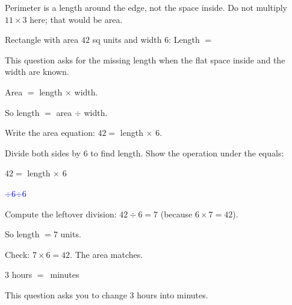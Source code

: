 
Perimeter is a length around the edge, not the space inside. Do not multiply
$11 \times 3$ here; that would be area.


Rectangle with area $42$ sq units and width $6$: Length $= $\ansblank


This question asks for the missing length when the flat space inside and the
width are known.

\begin{words}
  \item Area $=$ length $\times$ width.
  \item So length $=$ area $\div$ width.
\end{words}

\begin{steps}
  \item Write the area equation: $42 = $ length $\times$ 6.
  \item Divide both sides by 6 to find length. Show the operation under the
        equals:
        \begin{center}
          $42 = $ length $\times$ 6\par\smallskip
          \underline{\hspace{0.6em}\textcolor{blue}{$\div 6$}\hspace{1.6em}\textcolor{blue}{$\div 6$}\hspace{0.6em}}
        \end{center}
  \item Compute the leftover division: $42 \div 6 = 7$ (because $6 \times 7 = 42$).
  \item So length $= 7$ units.
\end{steps}


Check: $7 \times 6 = 42$. The area matches.



$3$ hours $= $\ansblank\ minutes


This question asks you to change 3 hours into minutes.

